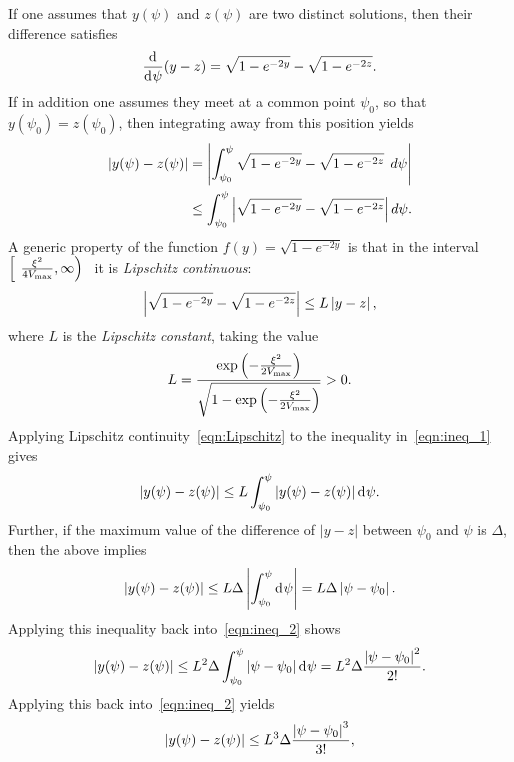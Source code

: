 If one assumes that $y(\psi)$ and $z(\psi)$ are two distinct solutions, then their difference satisfies
%
\begin{equation}
  \frac{\operatorname{d}^{}\!{}}{\operatorname{d}^{}\!{\psi}}(y-z)
  =
  \sqrt{1-e^{-2y}} - \sqrt{1-e^{-2z}}.
  \label{eqn:master_diff}
\end{equation}
%
If in addition one assumes they meet at a common point $\psi_0$, so that $y(\psi_0)=z(\psi_0)$, then integrating away from this position yields
%
\begin{align}
  \left|y(\psi)-z(\psi)\right|
  &=
  \left|\int_{\psi_0}^\psi \sqrt{1-e^{-2y}}
  - \sqrt{1-e^{-2z}}\:\:d\psi\right|
  \nonumber\\
  &
  \le \int_{\psi_0}^\psi \left|\sqrt{1-e^{-2y}}
  - \sqrt{1-e^{-2z}}\right|d\psi.
  \label{eqn:ineq_1}
\end{align}
%
A generic property of the function $f(y)=\sqrt{1-e^{-2y}}$ is that in the interval $\left[\phantom(\frac{\vellim^2}{4\Vm},\infty\right)\phantom]$ it is {\em Lipschitz continuous\/}:
%
\begin{equation}
  \left|\sqrt{1-e^{-2y}} - \sqrt{1-e^{-2z}}\right| \le L\left|y-z\right|,
  \label{eqn:Lipschitz}
\end{equation}
%
where $L$ is the {\em Lipschitz constant}, taking the value
%
\begin{equation}
  L
  = 
  \frac{\exp{\left(-\frac{\xi^2}{2V_\mathrm{max}}\right)}}
  {\sqrt{1-\exp{\left(-\frac{\xi^2}{2V_\mathrm{max}}\right)}}} 
  > 0.
\end{equation}
%                                              
Applying Lipschitz continuity~\eqref{eqn:Lipschitz} to the inequality in~\eqref{eqn:ineq_1} gives    
%
\begin{equation}
  \left|y(\psi)-z(\psi)\right| 
  \le
  L\int_{\psi_0}^\psi\left|y(\psi)-z(\psi)\right|\operatorname{d}^{}\!{\psi}.
  \label{eqn:ineq_2}
\end{equation}
%
Further, if the maximum value of the difference of $|y-z|$ between $\psi_0$ and $\psi$ is $\Delta$, then the above implies
%
\begin{equation}
  \left|y(\psi)-z(\psi)\right| 
  \le
  L\Delta\left|\int_{\psi_0}^\psi \operatorname{d}^{}\!{\psi}\right|= 
  L\Delta\left|\psi-\psi_0\right|.
\end{equation}
%
Applying this inequality back into~\eqref{eqn:ineq_2} shows
%
\begin{equation}
  \left|y(\psi)-z(\psi)\right| 
  \le
  L^2\Delta\int_{\psi_0}^\psi\left|\psi-\psi_0\right|\operatorname{d}^{}\!{\psi} =
  L^2\Delta\frac{\left|\psi-\psi_0\right|^2}{2!}.
\end{equation}
%
Applying this back into~\eqref{eqn:ineq_2} yields
%
\begin{equation}
  \left|y(\psi)-z(\psi)\right| 
  \le
  L^3\Delta\frac{\left|\psi-\psi_0\right|^3}{3!},
\end{equation}
